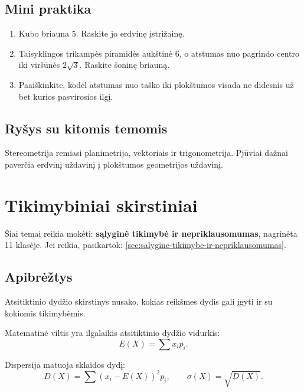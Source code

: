 \subsection{Mini praktika}
\begin{enumerate}[label=\alph*)]
\item Kubo briauna \(5\). Raskite jo erdvinę įstrižainę.
\item Taisyklingos trikampės piramidės aukštinė \(6\), o atstumas nuo pagrindo centro iki viršūnės \(2\sqrt3\). Raskite šoninę briauną.
\item Paaiškinkite, kodėl atstumas nuo taško iki plokštumos visada ne didesnis už bet kurios pasvirosios ilgį.
\end{enumerate}

\subsection{Ryšys su kitomis temomis}
Stereometrija remiasi planimetrija, vektoriais ir trigonometrija. Pjūviai dažnai paverčia erdvinį uždavinį į plokštumos geometrijos uždavinį.

\section{Tikimybiniai skirstiniai}\label{sec:tikimybiniai-skirstiniai}

\begin{tcolorbox}[title=Primename iš ankstesnių klasių, colback=yellow!10]
Šiai temai reikia mokėti: \textbf{sąlyginė tikimybė ir nepriklausomumas}, nagrinėta 11 klasėje.
Jei reikia, pasikartok: \ref{sec:salygine-tikimybe-ir-nepriklausomumas}.
\end{tcolorbox}

\subsection{Apibrėžtys}
\begin{apibreztis}
Atsitiktinio dydžio skirstinys nusako, kokias reikšmes dydis gali įgyti ir su kokiomis tikimybėmis.
\end{apibreztis}
\begin{apibreztis}
Matematinė viltis yra ilgalaikis atsitiktinio dydžio vidurkis:
\[
E(X)=\sum x_i p_i.
\]
\end{apibreztis}
\begin{apibreztis}
Dispersija matuoja sklaidos dydį:
\[
D(X)=\sum (x_i-E(X))^2p_i,\qquad \sigma(X)=\sqrt{D(X)}.
\]
\end{apibreztis}

